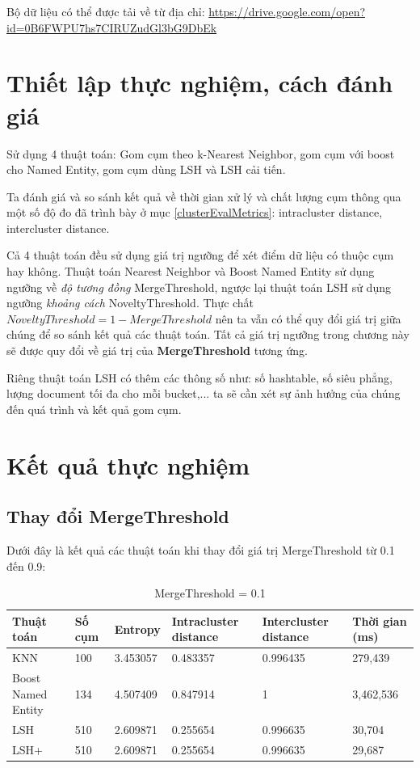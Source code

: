 Bộ dữ liệu có thể được tải về từ địa chỉ: \url{https://drive.google.com/open?id=0B6FWPU7hs7CIRUZudGl3bG9DbEk}

\section{Thiết lập thực nghiệm, cách đánh giá}
Sử dụng 4 thuật toán: Gom cụm theo k-Nearest Neighbor, gom cụm với boost cho Named Entity, gom cụm dùng LSH và LSH cải tiến. 

Ta đánh giá và so sánh kết quả về thời gian xử lý và chất lượng cụm thông qua một số độ đo đã trình bày ở mục \ref{clusterEvalMetrics}: intracluster distance, intercluster distance.

Cả 4 thuật toán đều sử dụng giá trị ngưỡng để xét điểm dữ liệu có thuộc cụm hay không. Thuật toán Nearest Neighbor và Boost Named Entity sử dụng ngưỡng về \textit{độ tương đồng} MergeThreshold, ngược lại thuật toán LSH sử dụng ngưỡng \textit{khoảng cách} NoveltyThreshold. Thực chất $NoveltyThreshold = 1 - MergeThreshold$ nên ta vẫn có thể quy đổi giá trị giữa chúng để so sánh kết quả các thuật toán. Tất cả giá trị ngưỡng trong chương này sẽ được quy đổi về giá trị của \textbf{MergeThreshold} tương ứng.

Riêng thuật toán LSH có thêm các thông số như: số hashtable, số siêu phẳng, lượng document tối đa cho mỗi bucket,... ta sẽ cần xét sự ảnh hưởng của chúng đến quá trình và kết quả gom cụm.
\section{Kết quả thực nghiệm}

	\subsection{Thay đổi MergeThreshold}
	Dưới đây là kết quả các thuật toán khi thay đổi giá trị MergeThreshold từ 0.1 đến 0.9:
		\begin{table}[H]
			\centering
			\setlength\extrarowheight{3pt}
			\begin{tabular}{|l|p{1.4cm}|p{1.5cm}|p{2cm}|p{2cm}|p{1.8cm}|}
				\hline
				Thuật toán  & Số cụm   & Entropy & Intracluster distance & Intercluster distance & Thời gian (ms) \\
				\hline
				KNN   & 100   & 3.453057 & 0.483357 & 0.996435 & 279,439 \\
				\hline
				Boost Named Entity & 134 & 4.507409	& 0.847914 & 1	& 3,462,536 \\
				\hline
				LSH   & 510   & 2.609871 & 0.255654 & 0.996635 & 30,704 \\
				\hline
				LSH+  & 510   & 2.609871 & 0.255654 & 0.996635 & 29,687 \\
				\hline
			\end{tabular}%
		
			\caption{MergeThreshold = 0.1} \label{tab:table_4_1}%
		\end{table}
		
